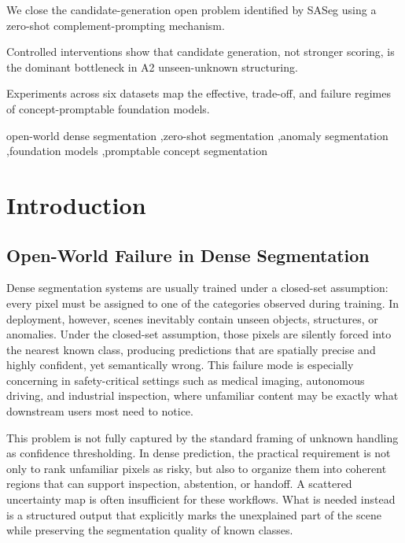 \documentclass[a4paper,fleqn]{cas-dc}
\begin{document}
\begin{highlights}
\item We close the candidate-generation open problem identified by SASeg using a zero-shot complement-prompting mechanism.
\item Controlled interventions show that candidate generation, not stronger scoring, is the dominant bottleneck in A2 unseen-unknown structuring.
\item Experiments across six datasets map the effective, trade-off, and failure regimes of concept-promptable foundation models.
\end{highlights}

\begin{keywords}
open-world dense segmentation \sep zero-shot segmentation \sep anomaly segmentation \sep foundation models \sep promptable concept segmentation
\end{keywords}

\maketitle

\section{Introduction}
\label{sec:intro}

\subsection{Open-World Failure in Dense Segmentation}
\label{sec:intro:problem}

Dense segmentation systems are usually trained under a closed-set assumption: every pixel must be assigned to one of the categories observed during training. In deployment, however, scenes inevitably contain unseen objects, structures, or anomalies. Under the closed-set assumption, those pixels are silently forced into the nearest known class, producing predictions that are spatially precise and highly confident, yet semantically wrong. This failure mode is especially concerning in safety-critical settings such as medical imaging, autonomous driving, and industrial inspection, where unfamiliar content may be exactly what downstream users most need to notice.

This problem is not fully captured by the standard framing of unknown handling as confidence thresholding. In dense prediction, the practical requirement is not only to rank unfamiliar pixels as risky, but also to organize them into coherent regions that can support inspection, abstention, or handoff. A scattered uncertainty map is often insufficient for these workflows. What is needed instead is a structured output that explicitly marks the unexplained part of the scene while preserving the segmentation quality of known classes.
\end{document}
